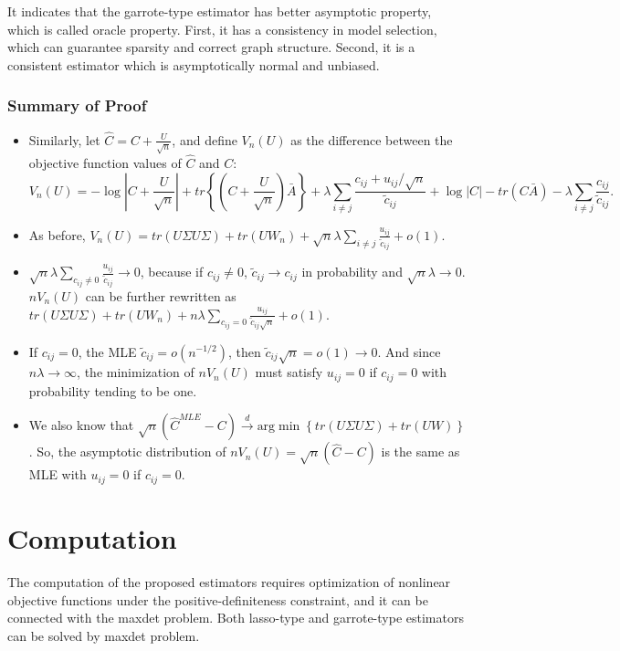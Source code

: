 \documentclass[11pt]{article} %
\begin{document}
It indicates that the garrote-type estimator has better asymptotic property, which is called oracle property. First, it has a consistency in model selection, which can guarantee sparsity and correct graph structure. Second, it is a consistent estimator which is asymptotically normal and unbiased. 
\subsubsection{Summary of Proof}
\begin{itemize}
\item Similarly, let $\hat{C}=C+\frac{U}{\sqrt{n}}$, and define $V_n(U)$ as the difference between the objective function values of $\hat{C}$ and $C$: 
\[V_n(U)=-\log\left\vert C+\frac{U}{\sqrt{n}}\right\vert +tr\left\lbrace \left( C+\frac{U}{\sqrt{n}}\right) \bar{A}\right\rbrace +\lambda \sum_{i\neq j} \frac{c_{ij}+u_{ij}/\sqrt{n}}{\tilde{c}_{ij}} +\log|C|-tr(C\bar{A})-\lambda \sum_{i\neq j}\frac{c_{ij}}{\tilde{c}_{ij}} \mbox{.}\]
\item As before, $V_n(U)=tr(U\Sigma U\Sigma )+tr(UW_n)+\sqrt{n} \lambda \sum_{i\neq j}\frac{u_{ij}}{\tilde{c}_{ij}} +o(1)$.
\item $\sqrt{n} \lambda \sum_{c_{ij}\neq 0}\frac{u_{ij}}{\tilde{c}_{ij}} \rightarrow 0$, because if $c_{ij}\neq 0$, $\tilde{c}_{ij} \rightarrow c_{ij}$ in probability and $\sqrt{n} \lambda \rightarrow 0$. $nV_n(U)$ can be further rewritten as $tr(U\Sigma U\Sigma )+tr(UW_n)+n\lambda \sum_{c_{ij}=0}\frac{u_{ij}}{\tilde{c}_{ij} \sqrt{n}} +o(1)$. 
\item If $c_{ij}=0$, the MLE $\tilde{c}_{ij}=o(n^{-1/2})$, then $\tilde{c}_{ij} \sqrt{n}=o(1)\rightarrow 0$. And since $n\lambda \rightarrow \infty$, the minimization of $nV_n(U)$ must satisfy $u_{ij}=0$ if $c_{ij}=0$ with probability tending to be one. 
\item We also know that $\sqrt{n} \left( \hat{C}^{MLE} - C\right) \stackrel{d}{\rightarrow} \mbox{arg} \min \left\lbrace tr(U\Sigma U\Sigma)+tr(UW)\right\rbrace$. So, the asymptotic distribution of $nV_n(U)=\sqrt{n} \left( \hat{C} - C\right)$ is the same as MLE with $u_{ij}=0$ if $c_{ij}=0$.
\end{itemize}

\section{Computation}
The computation of the proposed estimators requires optimization of nonlinear objective functions under the positive-definiteness constraint, and it can be connected with the maxdet problem. Both lasso-type and garrote-type estimators can be solved by maxdet problem. 
\end{document}
